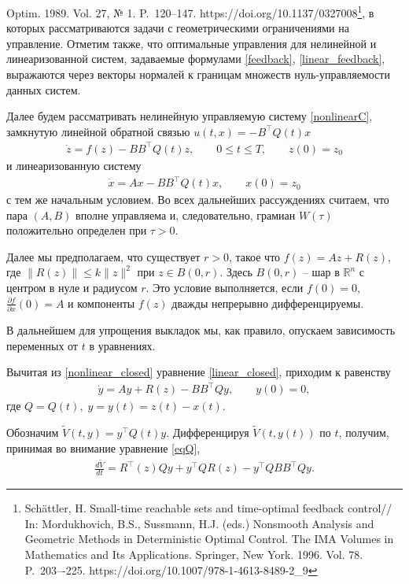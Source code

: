 \documentclass[../main.tex]{subfiles}
\begin{document}
{Optim. 1989. Vol. 27, № 1. P.~120--147. https://doi.org/10.1137/0327008}\footnote{Sch\"{a}ttler, H. Small-time reachable sets and time-optimal feedback control// In: Mordukhovich, B.S.,
Sussmann, H.J. (eds.) Nonsmooth Analysis and Geometric Methods in Deterministic Optimal Control.
The IMA Volumes in Mathematics and Its Applications. Springer, New York. 1996. Vol. 78. P.~203–-225. https://doi.org/10.1007/978-1-4613-8489-2\_9}, в которых  рассматриваются задачи с геометрическими ограничениями на управление. Отметим также, что  оптимальные  управления для нелинейной и линеаризованной систем, задаваемые формулами \eqref{feedback}, \eqref{linear_feedback}, выражаются через векторы  нормалей к границам множеств нуль-управляемости данных систем. 

Далее будем рассматривать нелинейную управляемую систему \eqref{nonlinearC}, замкнутую линейной обратной связью $u(t,x) = - B^{\top}Q(t) x$ 
\begin{gather}\label{nonlinear_closed}
	\dot{z} = f(z) - B B^{\top} Q(t) z, \qquad 0 \leqslant t \leqslant T, \qquad z(0) = z_0
\end{gather}
и линеаризованную систему 
\begin{gather}\label{linear_closed}
	\dot{x} = A x - B B^{\top} Q(t) x, \qquad x(0)=z_0
\end{gather}
с тем же начальным условием. Во всех дальнейших рассуждениях считаем, что пара $(A,B)$ вполне управляема и, следовательно, грамиан $W(\tau)$ положительно определен при $\tau >0$.

Далее мы предполагаем, что существует $r>0$, такое что  $ f(z) = Az + R(z) $, где $ \|R(z) \| \leqslant k \| z\|^2  $ при $ z \in B(0,r) $. Здесь $ B(0,r) $ -- шар в $ \mathbb{R}^n $ с центром в нуле и радиусом $ r $. Это  условие выполняется, если $ f(0) = 0 $, $ \frac{\partial f}{\partial x}(0) = A $ и компоненты $ f(z) $ дважды непрерывно дифференцируемы.

В дальнейшем для упрощения  выкладок  мы, как правило, опускаем зависимость переменных от $t$ в уравнениях.

Вычитая из \eqref{nonlinear_closed} уравнение \eqref{linear_closed}, приходим к равенству
\begin{gather*}
	\dot{y} = A y + R(z) - B B^{\top} Q y, \qquad y(0) =0, 
\end{gather*}
где $Q=Q(t),\; y=y(t) = z(t) - x(t) $. 

Обозначим $ \widetilde{V}(t,y) = y^{\top} Q(t) y $. Дифференцируя $ \widetilde{V}(t,y(t))$ по $t$,  получим, принимая во внимание уравнение \eqref{eqQ},
\begin{gather}\label{dV}
	\frac{d\widetilde{V}}{dt} = R^{\top}(z) Q y + y^{\top} Q R(z) - y^{\top} Q B B^{\top} Q y. 
\end{gather}
\end{document}
